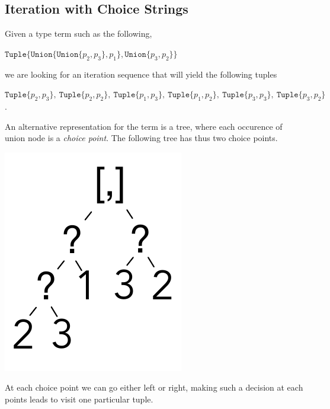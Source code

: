 \documentclass[a4paper,english]{lipics-v2019}
\newcommand{\xt}[1]{\texttt{#1}}
\newcommand{\union}[2]{\xt{Union\{}#1,#2\xt{\}}}
\newcommand{\tuple}[1]{\xt{Tuple\{}#1\xt{\}}}
\begin{document}
\subsection{Iteration with Choice Strings}\label{cs}

Given a type term such as the following,

\medskip
$\tuple{ \union{ \union{p_2}{p_3} }{p_1}, \union{p_3}{p_2}}$
\medskip

\noindent
we are looking for an iteration sequence that will yield the following tuples

\medskip
\noindent $\tuple{p_2,p_3}, ~ \tuple{p_2,p_2}, ~ \tuple{p_1,p_3}, ~ \tuple{p_1,p_2}, ~
  \tuple{p_3,p_3}, ~ \tuple{p_3,p_2}$.
\medskip\vspace{-3mm}

\noindent
An alternative representation for the term is a tree, where each occurence
of union node is a \emph{choice point}. The following tree has thus two
choice points.

\includegraphics[scale=.25]{figures/tree1.pdf}

\noindent
At each choice point we can go either left or right, making such a decision
at each points leads to visit one particular tuple.
\end{document}
